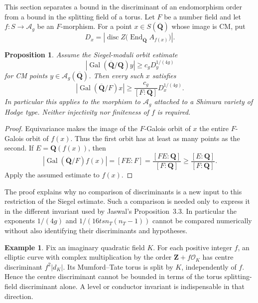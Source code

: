 \documentclass[11pt]{article}
\newtheorem{proposition}[theorem]{Proposition}
\theoremstyle{definition}
\newtheorem{example}[theorem]{Example}
\theoremstyle{remark}
\begin{document}
This section separates a bound in the discriminant of an endomorphism
order from a bound in the splitting field of a torus.
Let $F$ be a number field and let
$f:S\longrightarrow\mathcal A_g$ be an $F$-morphism.
For a point $x\in S(\overline{\mathbf Q})$ whose image is CM, put
\[
 D_x=\left|\operatorname{disc}
 Z\bigl(\operatorname{End}_{\overline{\mathbf Q}}A_{f(x)}\bigr)\right|.
\]

\begin{proposition}\label{prop:orbit-transfer}
Assume the Siegel-moduli orbit estimate
\[
 |\operatorname{Gal}(\overline{\mathbf Q}/\mathbf Q)y|
 \geq c_g D_y^{1/(4g)}
\]
for CM points $y\in\mathcal A_g(\overline{\mathbf Q})$.
Then every such $x$ satisfies
\[
 |\operatorname{Gal}(\overline{\mathbf Q}/F)x|
 \geq \frac{c_g}{[F:\mathbf Q]}D_x^{1/(4g)}.
\]
In particular this applies to the morphism to $\mathcal A_g$ attached
to a Shimura variety of Hodge type.  Neither injectivity nor finiteness
of $f$ is required.
\end{proposition}

\begin{proof}
Equivariance makes the image of the $F$-Galois orbit of $x$ the entire
$F$-Galois orbit of $f(x)$.  Thus the first orbit has at least as many
points as the second.  If $E=\mathbf Q(f(x))$, then
\[
 |\operatorname{Gal}(\overline{\mathbf Q}/F)f(x)|
 =[FE:F]=\frac{[FE:\mathbf Q]}{[F:\mathbf Q]}
 \geq\frac{[E:\mathbf Q]}{[F:\mathbf Q]}.
\]
Apply the assumed estimate to $f(x)$.
\end{proof}

The proof explains why no comparison of discriminants is a new input
to this restriction of the Siegel estimate.  Such a comparison is
needed only to express it in the different invariant used by
Jaswal's Proposition~3.3.  In particular the exponents
$1/(4g)$ and $1/(16tsn_T(n_T-1))$ cannot be compared numerically
without also identifying their discriminants and hypotheses.

\begin{example}\label{ex:conductor-torus}
Fix an imaginary quadratic field $K$.  For each positive integer $f$,
an elliptic curve with complex multiplication by the order
$\mathbf Z+f\mathcal O_K$ has centre discriminant
$f^2|d_K|$.  Its Mumford--Tate torus is split by $K$, independently of
$f$.  Hence the centre discriminant cannot be bounded in terms of
the torus splitting-field discriminant alone.  A level or conductor
invariant is indispensable in that direction.
\end{example}
\end{document}
